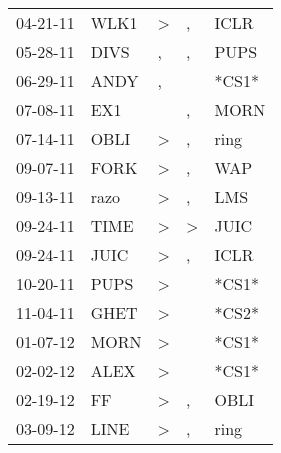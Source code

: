 \begin{supertabular}{p{0.07\textwidth}p{0.06\textwidth}p{0.02\textwidth}p{0.02\textwidth}p{0.06\textwidth}}
          04-21-11\textsuperscript{} &           WLK1\textsuperscript{} &     \textgreater &             , &           ICLR\textsuperscript{} \\
          05-28-11\textsuperscript{} &           DIVS\textsuperscript{} &                , &             , &           PUPS\textsuperscript{} \\
          06-29-11\textsuperscript{} &           ANDY\textsuperscript{} &                , &               &                            *CS1* \\
          07-08-11\textsuperscript{} &            EX1\textsuperscript{} &                  &             , &           MORN\textsuperscript{} \\
          07-14-11\textsuperscript{} &           OBLI\textsuperscript{} &     \textgreater &             , &           ring\textsuperscript{} \\
          09-07-11\textsuperscript{} &           FORK\textsuperscript{} &     \textgreater &             , &            WAP\textsuperscript{} \\
          09-13-11\textsuperscript{} &           razo\textsuperscript{} &     \textgreater &             , &            LMS\textsuperscript{} \\
          09-24-11\textsuperscript{} &           TIME\textsuperscript{} &     \textgreater &  \textgreater &           JUIC\textsuperscript{} \\
          09-24-11\textsuperscript{} &           JUIC\textsuperscript{} &     \textgreater &             , &           ICLR\textsuperscript{} \\
          10-20-11\textsuperscript{} &           PUPS\textsuperscript{} &     \textgreater &               &                            *CS1* \\
          11-04-11\textsuperscript{} &           GHET\textsuperscript{} &     \textgreater &               &                            *CS2* \\
          01-07-12\textsuperscript{} &           MORN\textsuperscript{} &     \textgreater &               &                            *CS1* \\
          02-02-12\textsuperscript{} &           ALEX\textsuperscript{} &     \textgreater &               &                            *CS1* \\
          02-19-12\textsuperscript{} &             FF\textsuperscript{} &     \textgreater &             , &           OBLI\textsuperscript{} \\
          03-09-12\textsuperscript{} &           LINE\textsuperscript{} &     \textgreater &             , &           ring\textsuperscript{} \\

\end{supertabular}
